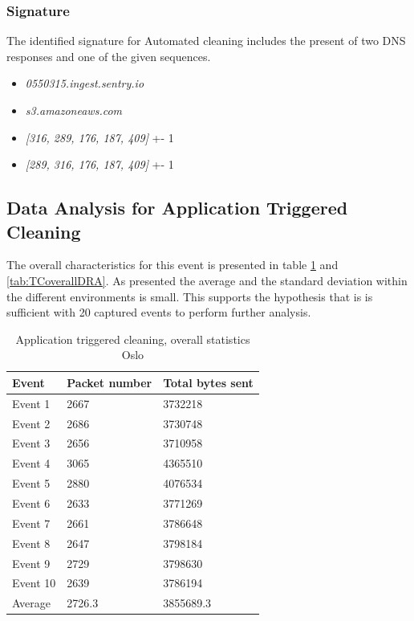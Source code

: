 \subsubsection{Signature}
The identified signature for Automated cleaning includes the present of two DNS responses and one of the given sequences.  

\begin{itemize}
    \item \textit{0550315.ingest.sentry.io}
    \item \textit{s3.amazoneaws.com}
    \item \textit{[316, 289, 176, 187, 409]} +- 1
    \item \textit{[289, 316, 176, 187, 409]} +- 1
\end{itemize}


\subsection{Data Analysis for Application Triggered Cleaning}
The overall characteristics for this event is presented in table \ref{tab:TCoverallOSL} and \ref{tab:TCoverallDRA}. As presented the average and the standard deviation within the different environments is small. This supports the hypothesis that is is sufficient with 20 captured events to perform further analysis.

\begin{table}[H]
\centering
\caption{Application triggered cleaning, overall statistics Oslo}
\label{tab:TCoverallOSL}
\begin{tabular}{|l|l|l|}
\hline
\textbf{Event} & \textbf{Packet number} & \textbf{Total bytes sent} \\ \hline
Event 1        & 2667                   & 3732218                   \\ \hline
Event 2        & 2686                   & 3730748                   \\ \hline
Event 3        & 2656                   & 3710958                   \\ \hline
Event 4        & 3065                   & 4365510                   \\ \hline
Event 5        & 2880                   & 4076534                   \\ \hline
Event 6        & 2633                   & 3771269                   \\ \hline
Event 7        & 2661                   & 3786648                   \\ \hline
Event 8        & 2647                   & 3798184                   \\ \hline
Event 9        & 2729                   & 3798630                   \\ \hline
Event 10       & 2639                   & 3786194                   \\ \hline
Average        & 2726.3                 & 3855689.3                 \\ \hline
\end{tabular}
\end{table}

